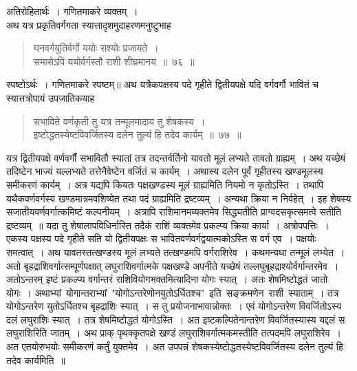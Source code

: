 \documentclass[11pt, openany]{book}
\begin{document}
अतिरोहितार्थः~। गणितमाकरे व्यक्तम्~। \\

\vspace{-3mm}
 अथ यत्र प्रकृतिवर्गगता स्यात्तादृशमुदाहरणमनुष्टुभाह\textendash 
\begin{quote}
    \ex
     घनवर्गयुतिर्वर्गो ययोः राश्योः प्रजायते~। \\
 समासेऽपि ययोर्वर्गस्तौ राशी शीघ्रमानय~॥~७६~॥~
\end{quote}

स्पष्टोऽर्थः~। गणितमाकरे स्पष्टम्॥
\newpage
 अथ यत्रैकपक्षस्य पदे गृहीते द्वितीयपक्षे यदि वर्गवर्गौ भावितं च 
स्यात्तत्रोपायं उपजातिकयाह\textendash
\begin{quote}
    \bs
      सभाविते वर्णकृती तु यत्र तन्मूलमादाय तु शेषकस्य~। \\
 इष्टोद्धतस्येष्टविवर्जितस्य दलेन तुल्यं हि तदेव कार्यम्~॥~७७~॥~

\end{quote}

यत्र द्वितीयपक्षे वर्णवर्गौं सभावितौ स्यातां तत्र तदन्तर्वर्तिनो यावतो मूलं 
लभ्यते तावतो ग्राह्यम्~। अथ यच्छेषं तदिष्टेन भाज्यं यल्लभ्यते तत्तेनैवेष्टेन 
वर्जितं च कार्यम्~। अथास्य दलेन पूर्वं गृहीतस्य खण्डमूलस्य समीकरणं 
कार्यम्~। अत्र यद्यपि कियतः पक्षखण्डस्य मूलं ग्राह्यमिति नियमो न कृतोऽस्ति~। 
तथापि यथैकवर्णवर्गस्य खण्डमात्रमवशिष्येत तथा पदं ग्राह्यमिति द्रष्टव्यम्~। 
अन्यथा क्रिया न निर्वहेत्~। इह शेषस्य सजातीयवर्णवर्गात्कमिष्टं कल्पनीयम्~। 
अत्रापि राशिमानमव्यक्तमेव सिद्ध्यतीति प्राग्वदसकृत्समत्वे सतीति द्रष्टव्यम्~॥ 
यदा तु शेषालापविधिर्नास्ति तदैकं राशिं व्यक्तमेव प्रकल्प्य क्रिया कार्या~। 
अत्रोपपत्तिः~। एकस्य पक्षस्य पदे गृहीते सति यो द्वितीयपक्षः स 
भावितवर्णवर्गद्वयात्मकोऽस्ति स वर्ग एव~। पक्षयोः समत्वात्~। अथ यावतस्तत्खण्डस्य मूलं लभ्यते तत्खण्डमपि वर्गराशिरेव~। कथमन्यथा तन्मूलं लभ्येत~।
अतो बृहद्राशिवर्गात्सम्पूर्णपक्षात् लघुराशिवर्गात्मके पक्षखण्डे अपनीते यच्छेषं 
तल्लघुबृहद्राश्योर्वर्गान्तरमेव~। अतोऽन्तरम् इष्टं प्रकल्प्य वर्गान्तरं
राशिवियोगभक्तमित्यादिना योगः स्यात्~। अतः शेषमिष्टोद्धतं जातो योगः~। अथाभ्यां \,योगान्तराभ्यां \,{\qt "योगोऽन्तरेणोनयुतोऽर्धितश्च"} \,इति \,सङ्क्रमणेन \,राशी \,स्याताम्~। तत्र योगोऽन्तरेण युतोऽर्धितश्च बृहद्राशिः स्यात्~। स तु प्रयोजनाभावान्नोक्तः~। एवं योगोऽन्तरेण विवर्जितोऽस्य दलं लघुराशिः स्यात्~। तत्र शेषमिष्टोद्धतं योगोऽस्ति~। अत इष्टकल्पितेनान्तरेण विवर्जितस्यास्य यद्दलं स लघुराशिरिति जातम्~। अथ प्राक् पृथक्कृतपक्षे खण्डं लघुराशिवर्गात्मकमस्तीति तत्पदमपि लघुराशिरेव~। अत एतयोरुभयोः समीकरणं कर्तुं युक्तमेव~। अत उपपन्नं 
शेषकस्येष्टोद्धतस्येष्टविवर्जितस्य दलेन तुल्यं हि तदेव कार्यमिति~॥
\end{document}
